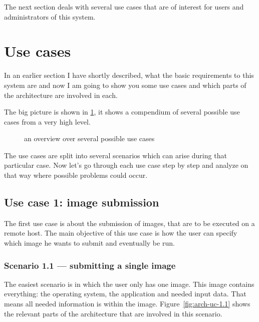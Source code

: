 The next  section deals with  several use cases  that are of  interest for
users and administrators of this system.

\section{Use cases}

In  an  earlier   section  I  have  shortly  described,   what  the  basic
requirements to this  system are and now  I am going to show  you some use
cases and which parts of the architecture are involved in each.

The  big  picture  is  shown  in  \ref{fig:system-usecases},  it  shows  a
compendium of several possible use cases from a very high level.

\begin{figure}[htbp]
  \begin{center}
  \end{center}
  \caption[Use case overview]{an overview over several possible use cases}
  \label{fig:system-usecases}
\end{figure}

The use cases are split into several scenarios which can arise during that
particular  case. Now  let's go  through each  use case  step by  step and
analyze on that way where possible problems could occur.

\subsection{Use case 1: image submission}
\label{uc:1}

The  first use case  is about  the submission  of images,  that are  to be
executed on a remote host. The main  objective of this use case is how the
user can specify which image he wants to submit and eventually be run.

\subsubsection{Scenario 1.1 --- submitting a single image}

The easiest scenario  is in which the user only has  one image. This image
contains  everything: the  operating  system, the  application and  needed
input  data.  That  means  all needed  information  is within  the image.  
Figure~\ref{fig:arch-uc-1.1} shows the  relevant parts of the architecture
that are involved in this scenario.

